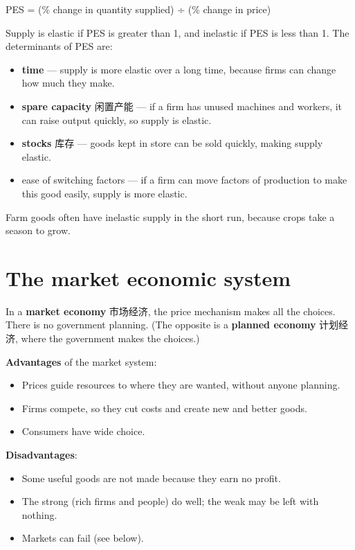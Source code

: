 \documentclass[11pt]{article}
\begin{document}
PES = (\% change in quantity supplied) ÷ (\% change in price)

Supply is elastic if PES is greater than 1, and inelastic if PES is less than 1. The determinants of PES are:

\begin{itemize}
\item \textbf{time} — supply is more elastic over a long time, because firms can change how much they make.

\item \textbf{spare capacity} 闲置产能 — if a firm has unused machines and workers, it can raise output quickly, so supply is elastic.

\item \textbf{stocks} 库存 — goods kept in store can be sold quickly, making supply elastic.

\item ease of switching factors — if a firm can move factors of production to make this good easily, supply is more elastic.

\end{itemize}

Farm goods often have inelastic supply in the short run, because crops take a season to grow.

\section*{The market economic system}

In a \textbf{market economy} 市场经济, the price mechanism makes all the choices. There is no government planning. (The opposite is a \textbf{planned economy} 计划经济, where the government makes the choices.)

\textbf{Advantages} of the market system:

\begin{itemize}
\item Prices guide resources to where they are wanted, without anyone planning.

\item Firms compete, so they cut costs and create new and better goods.

\item Consumers have wide choice.

\end{itemize}

\textbf{Disadvantages}:

\begin{itemize}
\item Some useful goods are not made because they earn no profit.

\item The strong (rich firms and people) do well; the weak may be left with nothing.

\item Markets can fail (see below).

\end{itemize}
\end{document}
